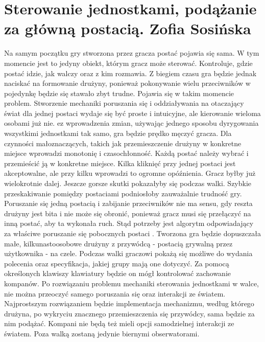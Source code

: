 \section{Sterowanie jednostkami, podążanie za główną postacią. Zofia Sosińska}\label{chap:sjpzgp}

    Na samym początku gry stworzona przez gracza postać pojawia się sama. W tym momencie jest to jedyny obiekt, którym gracz może sterować. Kontroluje, gdzie postać idzie, jak walczy oraz z kim rozmawia. Z biegiem czasu gra będzie jednak naciskać na formowanie drużyny, ponieważ pokonywanie wielu przeciwników w pojedynkę będzie się stawało zbyt trudne. Pojawia się w takim momencie problem. Stworzenie mechaniki poruszania się i oddziaływania na otaczający świat dla jednej postaci wydaje się być proste i intuicyjne, ale kierowanie wieloma osobami już nie. 
    ez wprowadzenia zmian, używając jednego sposobu dyrygowania wszystkimi jednostkami tak samo, gra będzie prędko męczyć gracza. Dla czynności małoznaczących, takich jak przemieszczenie drużyny w konkretne miejsce wprowadzi monotonię i czasochłonność. Każdą postać należy wybrać i przemieścić ją w konkretne miejsce. Kilka kliknięć przy jednej postaci jest akceptowalne, ale przy kilku wprowadzi to ogromne opóźnienia. Gracz byłby już wielokrotnie dalej. Jeszcze gorsze skutki pokazałyby się podczas walki. Szybkie przeskakiwanie pomiędzy postaciami podniosłoby zauważalnie trudność gry. Poruszanie się jedną postacią i zabijanie przeciwników nie ma sensu, gdy reszta drużyny jest bita i nie może się obronić, ponieważ gracz musi się przełączyć na inną postać, aby ta wykonała ruch. Stąd potrzeby jest algorytm odpowiadający za właściwe poruszanie się pobocznych postaci .
    Tworzona gra będzie dopuszczała małe, kilkunastoosobowe drużyny z przywódcą - postacią grywalną przez użytkownika - na czele. Podczas walki graczowi pokażą się możliwe do wydania polecenia oraz specyfikacja, jakiej grupy mają one dotyczyć. Za pomocą określonych klawiszy klawiatury będzie on mógł kontrolować zachowanie kompanów.
    Po rozwiązaniu problemu mechaniki sterowania jednostkami w walce, nie można przeoczyć samego poruszania się oraz interakcji ze światem. Najprostszym rozwiązaniem będzie implementacja mechanizmu, według którego drużyna, po wykryciu znacznego przemieszczenia się przywódcy, sama będzie za nim podążać. Kompani nie będą też mieli opcji samodzielnej interakcji ze światem. Poza walką zostaną jedynie biernymi obserwatorami.

